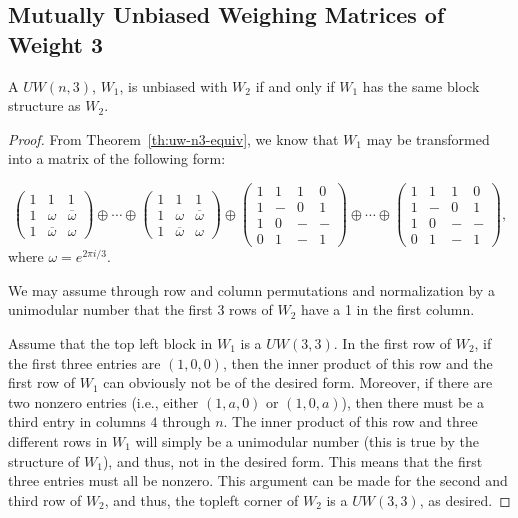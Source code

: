 \subsection[Weight 3]{Mutually Unbiased Weighing Matrices of Weight 3}
\label{sec:muwm-w3}

\begin{lemma} \label{lem:cw_n_3_blocks}
 A $UW(n,3)$, $W_1$, is unbiased with $W_2$ if and only if $W_1$ has the same block structure as $W_2$.

 \begin{proof}
  From Theorem~\ref{th:uw-n3-equiv}, we know that $W_1$ may be transformed into a matrix of the following form:

$$\left(
\begin{array}{ccc}
 1 & 1       &1 \\
 1 & \omega       &\overline{\omega} \\
 1 & \overline{\omega} &\omega       
\end{array}
\right) \oplus \cdots \oplus \left(
\begin{array}{ccc}
 1 & 1       &1 \\
 1 & \omega       &\overline{\omega} \\
 1 & \overline{\omega} &\omega      
\end{array}
\right) \oplus 
\left(
\begin{array}{cccc}
 1 & 1 &1 &0 \\
 1 & - &0 &1 \\
 1 & 0 &- &- \\
 0 & 1 &- &1
\end{array}
\right)
\oplus \cdots \oplus
\left(
\begin{array}{cccc}
 1 & 1 &1 &0 \\
 1 & - &0 &1 \\
 1 & 0 &- &- \\
 0 & 1 &- &1
\end{array}
\right),
$$
where $\omega = e^{{2\pi i}/{3}}$.

We may assume through row and column permutations and normalization by a unimodular number that the first 3 rows of $W_2$ have a 1 in the first column.

Assume that the top left block in $W_1$ is a $UW(3,3)$. In the first row of $W_2$, if the first three entries are $(1,0,0)$, then the inner product of this row and the first row of $W_1$ can obviously not be of the desired form. Moreover, if there are two nonzero entries (i.e., either $(1,a,0)$ or $(1,0,a)$), then there must be a third entry in columns $4$ through $n$. The inner product of this row and three different rows in $W_1$ will simply be a unimodular number (this is true by the structure of $W_1$), and thus, not in the desired form. This means that the first three entries must all be nonzero. This argument can be made for the second and third row of $W_2$, and thus, the topleft corner of $W_2$ is a $UW(3,3)$, as desired.


\end{proof}
\end{lemma}
